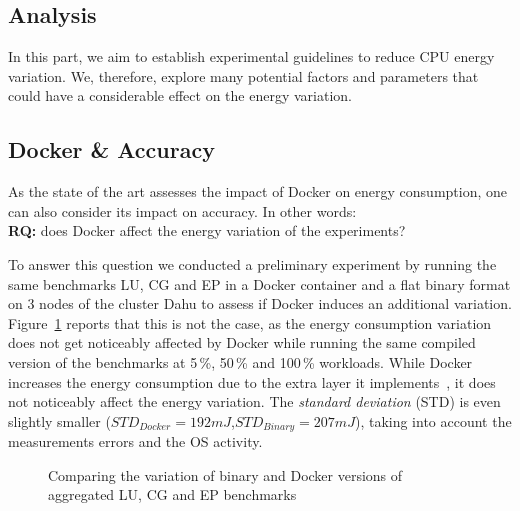 \subsection{Analysis}\label{subsec:parameters}
In this part, we aim to establish experimental guidelines to reduce CPU energy variation.
We, therefore, explore many potential factors and parameters that could have a considerable effect on the energy variation.

\subsection{Docker \& Accuracy}
As the state of the art assesses the impact of Docker on energy consumption, one can also consider its impact on accuracy.
In other words:\\
\textbf{RQ:} does Docker affect the energy variation of the experiments?

To answer this question we conducted a preliminary experiment by running the same benchmarks \textsf{LU}, \textsf{CG} and \textsf{EP} in a Docker container and a flat binary format on 3 nodes of the cluster \textsf{Dahu} to assess if Docker induces an additional variation.
Figure~\ref{fig:docker} reports that this is not the case, as the energy consumption variation does not get noticeably affected by Docker while running the same compiled version of the benchmarks at 5\,\%, 50\,\% and 100\,\% workloads.
While Docker increases the energy consumption due to the extra layer it implements~\cite{eddie_antonio_santos_how}, it does not noticeably affect the energy variation.
The \emph{standard deviation} (STD) is even slightly smaller ($STD_{Docker}=192 mJ$,$STD_{Binary}=207 mJ$), taking into account the measurements errors and the OS activity.

\begin{figure}
    \caption{Comparing the variation of binary and Docker versions of aggregated \textsf{LU}, \textsf{CG} and \textsf{EP} benchmarks}\label{fig:docker}
\end{figure}

